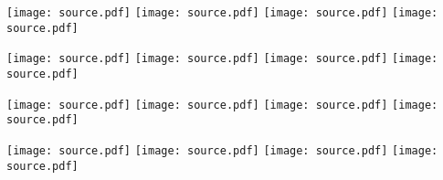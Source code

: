 \documentclass[letterpaper,landscape]{article}
\begin{document}
\texttt{[image: source.pdf]}\hfill
\texttt{[image: source.pdf]}\hfill
\texttt{[image: source.pdf]}\hfill
\texttt{[image: source.pdf]}\\

\vspace{7ex}

\texttt{[image: source.pdf]}\hfill
\texttt{[image: source.pdf]}\hfill
\texttt{[image: source.pdf]}\hfill
\texttt{[image: source.pdf]}\hfill

\newpage

\texttt{[image: source.pdf]}\hfill
\texttt{[image: source.pdf]}\hfill
\texttt{[image: source.pdf]}\hfill
\texttt{[image: source.pdf]}\\

\vspace{7ex}

\texttt{[image: source.pdf]}\hfill
\texttt{[image: source.pdf]}\hfill
\texttt{[image: source.pdf]}\hfill
\texttt{[image: source.pdf]}\hfill
\end{document}
